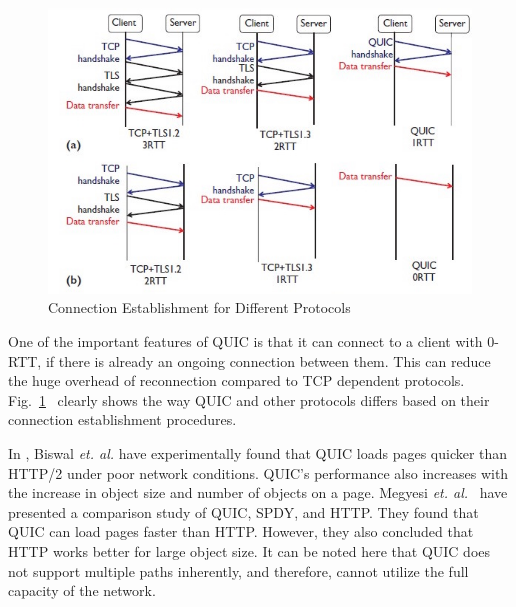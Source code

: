\begin{figure}[!ht]
    \centering
    \includegraphics[width=.9\textwidth]{img/quic/quicrrtcompare}
    \caption{Connection Establishment for Different Protocols~\cite{quicisquic}}
    \label{fig:Quic2}
\end{figure}

One of the important features of QUIC is that it can connect to a client with 0-RTT, if there is already an ongoing connection between them. This can reduce the huge overhead of reconnection compared to TCP dependent protocols. Fig.~\ref{fig:Quic2}~\cite{quicisquic} clearly shows the way QUIC and other protocols differs based on their connection establishment procedures. 
%
%

In \cite{quicmakewebfast}, Biswal \textit{et. al.} have experimentally found that QUIC loads pages quicker than HTTP/2 under poor network conditions. QUIC's performance also increases with the increase in object size and number of objects on a page. Megyesi \textit{et. al.}~\cite{quicisquic} have presented a comparison study of QUIC, SPDY, and HTTP. They found that QUIC can load pages faster than HTTP. However, they also concluded that HTTP works better for large object size. It can be noted here that QUIC does not support multiple paths inherently, and therefore, cannot utilize the full capacity of the network. 

